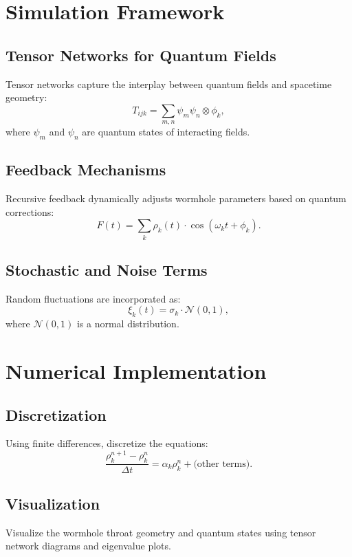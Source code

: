 \documentclass{article}
\theoremstyle{plain}
\begin{document}
\section{Simulation Framework}

\subsection{Tensor Networks for Quantum Fields}
Tensor networks capture the interplay between quantum fields and spacetime geometry:
\begin{equation}
    T_{ijk} = \sum_{m,n} \psi_m \psi_n \otimes \phi_k,
\end{equation}
where $\psi_m$ and $\psi_n$ are quantum states of interacting fields.

\subsection{Feedback Mechanisms}
Recursive feedback dynamically adjusts wormhole parameters based on quantum corrections:
\begin{equation}
    F(t) = \sum_{k} \rho_k(t) \cdot \cos(\omega_k t + \phi_k).
\end{equation}

\subsection{Stochastic and Noise Terms}
Random fluctuations are incorporated as:
\begin{equation}
    \xi_k(t) = \sigma_k \cdot \mathcal{N}(0,1),
\end{equation}
where $\mathcal{N}(0,1)$ is a normal distribution.

\section{Numerical Implementation}

\subsection{Discretization}
Using finite differences, discretize the equations:
\begin{equation}
    \frac{\rho_k^{n+1} - \rho_k^n}{\Delta t} = \alpha_k \rho_k^n + \text{(other terms)}.
\end{equation}

\subsection{Visualization}
Visualize the wormhole throat geometry and quantum states using tensor network diagrams and eigenvalue plots.
\end{document}
